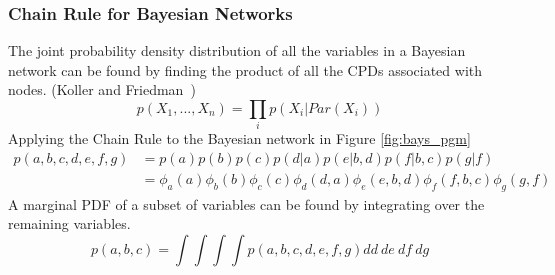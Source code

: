 \documentclass[12pt,oneside,openany,a4paper, %
afrikaans,english,
]{memoir}
\numberwithin{equation}{chapter}
\begin{document}
\subsubsection{Chain Rule for Bayesian Networks}
The joint probability density distribution of all the variables in a Bayesian network can be found by finding the product of all the CPDs associated with nodes. (Koller and Friedman~\citep{koller})
\begin{equation}
p(X_1, ..., X_n) = \prod_i p(X_i|Par(X_i))
\end{equation}
Applying the Chain Rule to the Bayesian network in Figure \ref{fig:bays_pgm}
\begin{equation}
\begin{split}
p(a,b,c,d,e,f,g) & = p(a)p(b)p(c)p(d|a)p(e|b,d)p(f|b,c)p(g|f)\\
& = \phi_a(a)\phi_b(b)\phi_c(c)\phi_d(d,a)\phi_e(e,b,d)\phi_f(f,b,c)\phi_g(g,f)
\end{split}
\end{equation}
A marginal PDF of a subset of variables can be found by integrating over the remaining variables.
\begin{equation}
p(a,b,c) = \int\int\int\int p(a,b,c,d,e,f,g)dd\ de\ df\ dg
\end{equation}
\end{document}
